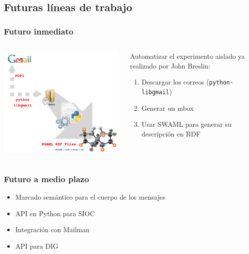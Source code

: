 \documentclass[spanish,notes=hide]{beamer}
\begin{document}
\subsection{Futuras líneas de trabajo}
\frame
{
  \frametitle{Futuro inmediato}


  \bigskip
  \begin{columns}
   \begin{column}{0.7\textwidth}
    \includegraphics[width=0.99\textwidth]{images/gmail-swaml.png}
   \end{column}
   \begin{column}{0.4\textwidth}
    Automatizar el experimento aislado ya realizado por John Breslin:
    \begin{enumerate}
     \item Descargar los correos (\texttt{python-libgmail})
     \item Generar un mbox
     \item Usar SWAML para generar su descripción en RDF
    \end{enumerate}
   \end{column}
  \end{columns}
  \bigskip
}
\frame
{
  \frametitle{Futuro a medio plazo}
  \begin{itemize}
   \item Marcado semántico para el cuerpo de los mensajes
   \item API en Python para SIOC
   \item Integración con Mailman
   \item API para DIG
  \end{itemize}
}
\end{document}
